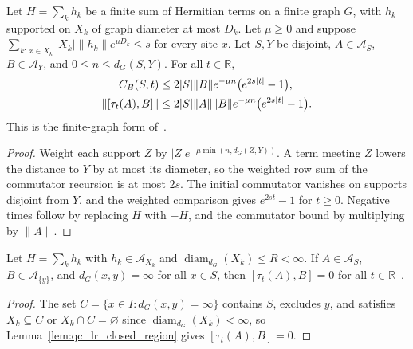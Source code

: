 \begin{lemma}
    \label{thm:qc_lr_disjoint}
    \leanok
    Let $H=\sum_kh_k$ be a finite sum of Hermitian terms on a finite graph $G$, with
    $h_k$ supported on $X_k$ of graph diameter at most $D_k$. Let $\mu\geq0$ and
    suppose $\sum_{k:\,x\in X_k}|X_k|\|h_k\|e^{\mu D_k}\leq s$ for every site $x$. Let
    $S,Y$ be disjoint, $A\in\mathcal A_S$, $B\in\mathcal A_Y$, and $0\le n\le d_G(S,Y)$.
    For all $t\in\mathbb R$,
    \begin{align}
        C_B(S,t)          & \leq2|S|\|B\|e^{-\mu n}\bigl(e^{2s|t|}-1\bigr),\notag      \\
        \|[\tau_t(A),B]\| & \leq2|S|\|A\|\|B\|e^{-\mu n}\bigl(e^{2s|t|}-1\bigr).\notag
    \end{align}
    This is the finite-graph form of~\cite[Appendix~A, Theorem~A.2]{Hastings2006Spectral}.
\end{lemma}
\begin{proof}\leanok
    Weight each support $Z$ by $|Z|e^{-\mu\min(n,d_G(Z,Y))}$. A term meeting $Z$ lowers
    the distance to $Y$ by at most its diameter, so the weighted row sum of the commutator
    recursion is at most $2s$. The initial commutator vanishes on supports disjoint from
    $Y$, and the weighted comparison gives $e^{2st}-1$ for $t\geq0$. Negative times follow
    by replacing $H$ with $-H$, and the commutator bound by multiplying by $\|A\|$.
\end{proof}

\begin{lemma}
    \label{thm:qc_graph_lieb_robinson_zero_finset}
    \leanok
    Let $H=\sum_k h_k$ with $h_k\in\mathcal A_{X_k}$ and $\operatorname{diam}_{d_G}(X_k)\le R<\infty$. If $A\in\mathcal A_S$, $B\in\mathcal A_{\{y\}}$, and $d_G(x,y)=\infty$ for all $x\in S$, then $[\tau_t(A),B]=0$ for all $t\in\mathbb R$~\cite[Lemma~4.1]{OpenAI2026AreaLaw}.
\end{lemma}
\begin{proof}\leanok
    The set $C=\{x\in I:d_G(x,y)=\infty\}$ contains $S$, excludes $y$, and satisfies $X_k\subseteq C$ or $X_k\cap C=\varnothing$ since $\operatorname{diam}_{d_G}(X_k)<\infty$, so Lemma~\ref{lem:qc_lr_closed_region} gives $[\tau_t(A),B]=0$.
\end{proof}

